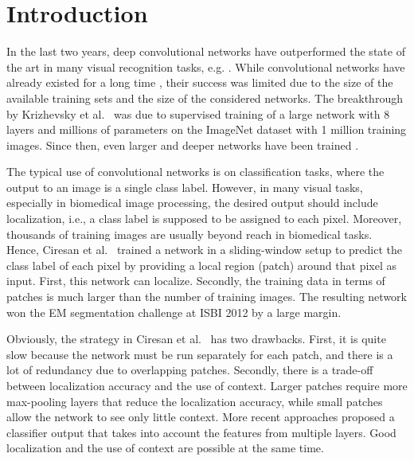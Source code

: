 \documentclass{llncs}
\begin{document}
\section{Introduction}

In the last two years, deep convolutional networks have outperformed the state of the art in many visual recognition tasks, e.g. \cite{Krizhevsky,R-CNN}. While convolutional networks have already existed for a long time \cite{LeCun_NC1989}, their success was limited due to the size of the available training sets and the size of the considered networks. The breakthrough by Krizhevsky et al.~\cite{Krizhevsky} was due to supervised training of a large network with 8 layers and millions of parameters on the ImageNet dataset with 1 million training images. Since then, even larger and deeper networks have been trained \cite{VGG}.

The typical use of convolutional networks is on classification tasks, where the output to an image is a single class label. However, in many visual tasks, especially in biomedical image processing, the desired output should include localization, i.e., a class label is supposed to be assigned to each pixel. Moreover, thousands of training images are usually beyond reach in biomedical tasks. Hence, Ciresan et al.~\cite{schmidhuber12deepneural} trained a network in a sliding-window setup to predict the class label of each pixel by providing a local region (patch) around that pixel as input. First, this network can localize. Secondly, the training data in terms of patches is much larger than the number of training images. The resulting network won the EM segmentation challenge at ISBI 2012 by a large margin.

Obviously, the strategy in Ciresan et al.~\cite{schmidhuber12deepneural} has two drawbacks. First, it is quite slow because the network must be run separately for each patch, and there is a lot of redundancy due to overlapping patches.
Secondly, there is a trade-off between localization accuracy and the use of context. Larger patches require more max-pooling layers that reduce the localization accuracy, while small patches allow the network to see only little context. More recent approaches \cite{Seyedhosseini2013,hypercolumns} proposed a classifier output that takes into account the features from multiple layers. Good localization and the use of context are possible at the same time.
\end{document}
